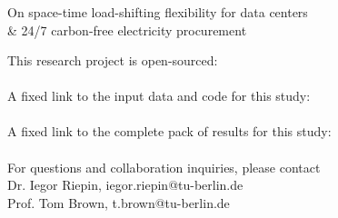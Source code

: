 



\begin{frame}\frametitle{\quad}

  {\Large
  \alert{On space-time load-shifting flexibility for data centers \\ 
  \& 24/7 carbon-free electricity procurement}
  }

  \vspace{.3cm}
  This research project is open-sourced: \\
  \faGithub~ \\
  A fixed link to the input data and code for this study: \\
  \faLink~ \\
  A fixed link to the complete pack of results for this study: \\
  \faLink~ \\

  \vspace{.3cm}
  For questions and collaboration inquiries, please contact \\
  Dr. Iegor Riepin, iegor.riepin@tu-berlin.de \\
  Prof. Tom Brown, t.brown@tu-berlin.de

\end{frame}

